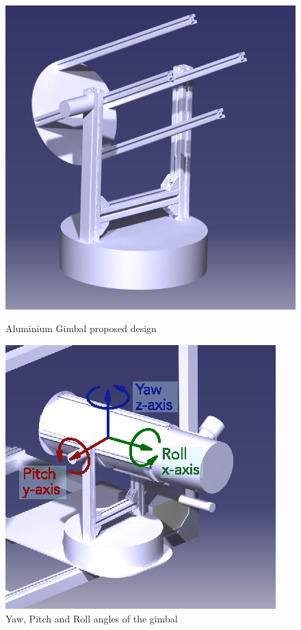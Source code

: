 \begin{figure}[h]
	\centering
	\begin{minipage}[t]{0.4\linewidth}
		\centering
		\includegraphics[width=\linewidth]{4-experiment-design/img/mechanical/Aluminium_Gimbal1.png}
		\caption{Aluminium Gimbal proposed design}
		\label{fig::mechanical::AlGim}
	\end{minipage}
	\hspace{0.1\linewidth}
	\begin{minipage}[t]{0.4\linewidth}
		\centering
		\includegraphics[width=\linewidth]{4-experiment-design/img/software/Yaw_Pitch_Roll.eps}
	\caption{Yaw, Pitch and Roll angles of the gimbal}
	\label{fig::software::Yaw_Pitch_Roll}
	\end{minipage}

\end{figure}
